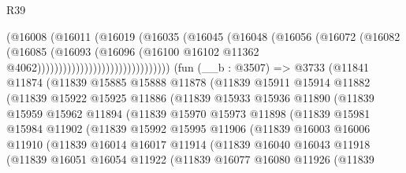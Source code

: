\begin{lexlean}{R39}
\begin{coremodule}
                                        (@16008
                                          (@16011
                                            (@16019
                                              (@16035
                                                (@16045
                                                  (@16048
                                                    (@16056
                                                      (@16072
                                                        (@16082
                                                          (@16085
                                                            (@16093
                                                              (@16096
                                                                (@16100
                                                                  @16102
                                                                  @11362
                                                                  @4062)))))))))))))))))))))))))))))))
    (fun (__b : @3507) =>
    @3733
      (@11841
        @11874
        (@11839
          @15885
          @15888
          @11878
          (@11839
            @15911
            @15914
            @11882
            (@11839
              @15922
              @15925
              @11886
              (@11839
                @15933
                @15936
                @11890
                (@11839
                  @15959
                  @15962
                  @11894
                  (@11839
                    @15970
                    @15973
                    @11898
                    (@11839
                      @15981
                      @15984
                      @11902
                      (@11839
                        @15992
                        @15995
                        @11906
                        (@11839
                          @16003
                          @16006
                          @11910
                          (@11839
                            @16014
                            @16017
                            @11914
                            (@11839
                              @16040
                              @16043
                              @11918
                              (@11839
                                @16051
                                @16054
                                @11922
                                (@11839
                                  @16077
                                  @16080
                                  @11926
                                  (@11839

\end{coremodule}
\end{lexlean}

